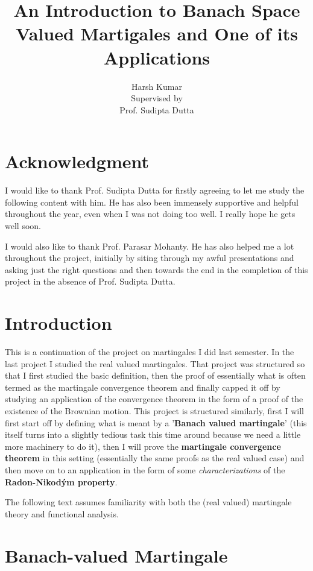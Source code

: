 \documentclass[]{report}
\title{An Introduction to Banach Space Valued Martigales and One of its Applications}
\author{Harsh Kumar\\ Supervised by \\ Prof. Sudipta Dutta}
\begin{document}
\maketitle

\newpage
\tableofcontents
\newpage

\chapter*{Acknowledgment}%
%
I would like to thank Prof. Sudipta Dutta for firstly agreeing to let me study the following content with him. He has also been immensely supportive and helpful throughout the year, even when I was not doing too well. I really hope he gets well soon. 

I would also like to thank Prof. Parasar Mohanty. He has also helped me a lot throughout the project, initially by siting through my awful presentations and asking just the right questions and then towards the end in the completion of this project in the absence of Prof. Sudipta Dutta.

\chapter*{Introduction}%
%
This is a continuation of the project on martingales I did last semester. In the last project I studied the real valued martingales. That project was structured so that I first studied the basic definition, then the proof of essentially what is often termed as the martingale convergence theorem and finally capped it off by studying an application of the convergence theorem in the form of a proof of the existence of the Brownian motion. This project is structured similarly, first I will first start off by defining what is meant by a '\textbf{Banach valued martingale}' (this itself turns into a slightly tedious task this time around because we need a little more machinery to do it), then I will prove the \textbf{martingale convergence theorem} in this setting (essentially the same proofs as the real valued case) and then move on to an application in the form of some \textit{characterizations} of the \textbf{Radon-Nikod\'{y}m property}. 

The following text assumes familiarity with both the (real valued) martingale theory and functional analysis.

\chapter{Banach-valued Martingale}
\end{document}
